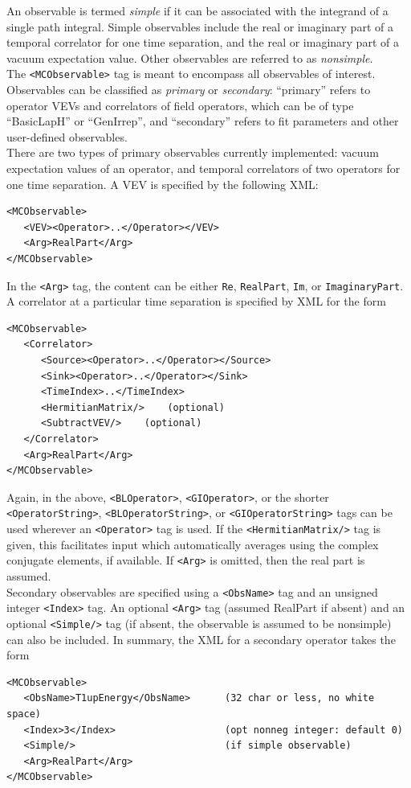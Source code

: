 \documentclass[12pt]{article}
\newcommand{\vb}{\texttt}
\begin{document}
An observable is termed \textit{simple} if it can be associated with
the integrand of a single path integral.  Simple observables include
the real or imaginary part of a temporal correlator
for one time separation, and the real or imaginary part of a vacuum
expectation value.  Other observables are referred to as \textit{nonsimple}.\\

The \vb{<MCObservable>} tag is meant to encompass all observables
of interest.  Observables can be classified as \textit{primary} or
\textit{secondary}:  ``primary'' refers to operator VEVs and correlators of
field operators, which can be of type ``BasicLapH'' or ``GenIrrep'', and
``secondary'' refers to fit parameters and other user-defined
observables.\\

There are two types of primary observables currently implemented: vacuum
expectation values of an operator, and temporal correlators of two
operators for one time separation.  A VEV is specified by the following XML:
\begin{verbatim}
<MCObservable>
   <VEV><Operator>..</Operator></VEV>
   <Arg>RealPart</Arg>
</MCObservable>
\end{verbatim}
In the \vb{<Arg>} tag, the content can be either \vb{Re},
\vb{RealPart}, \vb{Im}, or \vb{ImaginaryPart}.
A correlator at a particular time separation is specified by XML for the form
\begin{verbatim}
<MCObservable>
   <Correlator>
      <Source><Operator>..</Operator></Source>
      <Sink><Operator>..</Operator></Sink>
      <TimeIndex>..</TimeIndex>
      <HermitianMatrix/>    (optional)
      <SubtractVEV/>    (optional)
   </Correlator>
   <Arg>RealPart</Arg>
</MCObservable>
\end{verbatim}
Again, in the above,  \vb{<BLOperator>}, \vb{<GIOperator>}, or the shorter
\vb{<OperatorString>}, \vb{<BLOperatorString>}, or
\vb{<GIOperatorString>} tags can be used wherever an \vb{<Operator>}
tag is used. If the \vb{<HermitianMatrix/>} tag is given, this facilitates
input which automatically averages using the complex
conjugate elements, if available.  If \vb{<Arg>} is omitted, then
the real part is assumed.\\

Secondary observables are specified using a \vb{<ObsName>} tag and
an unsigned integer \vb{<Index>} tag.  An optional \vb{<Arg>} tag
(assumed RealPart if absent) and an optional \vb{<Simple/>}
tag (if absent, the observable is assumed to be nonsimple) can also
be included.   In summary, the XML for a secondary operator takes the form
\begin{verbatim}
<MCObservable>
   <ObsName>T1upEnergy</ObsName>      (32 char or less, no white space)
   <Index>3</Index>                   (opt nonneg integer: default 0)
   <Simple/>                          (if simple observable)
   <Arg>RealPart</Arg>
</MCObservable>
\end{verbatim}
\end{document}
